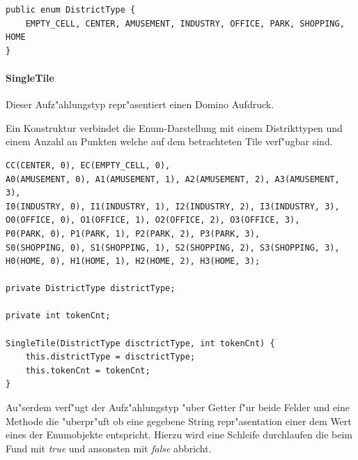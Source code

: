 \begin{lstlisting}[style=CodeHighlighting]
public enum DistrictType {
    EMPTY_CELL, CENTER, AMUSEMENT, INDUSTRY, OFFICE, PARK, SHOPPING, HOME
}
\end{lstlisting}


\paragraph{SingleTile}
\label{par:singleTile}
Dieser Aufz"ahlungstyp repr"asentiert einen Domino Aufdruck. 

Ein Konstruktur verbindet die Enum-Darstellung mit einem Distrikttypen und einem Anzahl an Punkten welche auf dem betrachteten Tile verf"ugbar sind. 

\begin{lstlisting}[style=CodeHighlighting]
CC(CENTER, 0), EC(EMPTY_CELL, 0),
A0(AMUSEMENT, 0), A1(AMUSEMENT, 1), A2(AMUSEMENT, 2), A3(AMUSEMENT, 3),
I0(INDUSTRY, 0), I1(INDUSTRY, 1), I2(INDUSTRY, 2), I3(INDUSTRY, 3),
O0(OFFICE, 0), O1(OFFICE, 1), O2(OFFICE, 2), O3(OFFICE, 3),
P0(PARK, 0), P1(PARK, 1), P2(PARK, 2), P3(PARK, 3),
S0(SHOPPING, 0), S1(SHOPPING, 1), S2(SHOPPING, 2), S3(SHOPPING, 3),
H0(HOME, 0), H1(HOME, 1), H2(HOME, 2), H3(HOME, 3);

private DistrictType districtType;

private int tokenCnt;

SingleTile(DistrictType disctrictType, int tokenCnt) {
    this.districtType = disctrictType;
    this.tokenCnt = tokenCnt;
}
\end{lstlisting}

Au"serdem verf"ugt der Aufz"ahlungstyp "uber Getter f"ur beide Felder und eine Methode die "uberpr"uft ob eine gegebene String repr"asentation einer dem Wert eines der Enumobjekte entspricht. Hierzu wird eine Schleife durchlaufen die beim Fund mit \emph{true} und ansonsten mit \emph{false} abbricht. 


